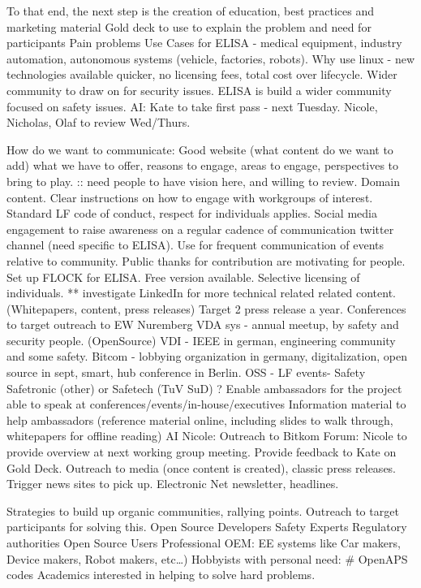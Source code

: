 \documentclass[12pt]{ElisaPaper}
\begin{document}
To that end, the next step is the creation of education, best practices and marketing material
Gold deck to use to explain the problem and need for participants
Pain problems
Use Cases for ELISA - medical equipment, industry automation,  autonomous systems (vehicle, factories, robots).   
Why use linux - new technologies available quicker,  no licensing fees, total cost over lifecycle.   Wider community to draw on for security issues.  ELISA is build a wider community focused on safety issues.
AI:  Kate to take first pass - next Tuesday.   Nicole, Nicholas, Olaf to review Wed/Thurs.  

How do we want to communicate:
Good website (what content do we want to add)
what we have to offer,  reasons to engage, areas to engage,  perspectives to bring to play. :: need people to have vision here, and willing to review.  Domain content.
Clear instructions on how to engage with workgroups of interest.
Standard LF code of conduct,  respect for individuals applies.
Social media engagement to raise awareness 
on a regular cadence of communication twitter channel (need specific to ELISA). Use for frequent communication of events relative to community.   Public thanks for contribution are motivating for people.   
Set up FLOCK for ELISA.   Free version available.  Selective licensing of individuals.   ** investigate
LinkedIn for more technical related related content.  (Whitepapers, content, press releases)
Target 2 press release a year.
Conferences to target outreach to 
EW Nuremberg
VDA sys - annual meetup, by safety and security people.  (OpenSource)
VDI - IEEE in german,  engineering community and some safety.
Bitcom - lobbying organization in germany,  digitalization,  open source in sept,  smart,  hub conference in Berlin. 
OSS - LF events- Safety
Safetronic (other) or Safetech (TuV SuD)
?
Enable ambassadors for the project able to speak at conferences/events/in-house/executives 
Information material to help ambassadors (reference material online, including slides to walk through, whitepapers for offline reading)
AI Nicole: Outreach to Bitkom Forum:  Nicole to provide overview at next working group meeting.  Provide feedback to Kate on Gold Deck.
Outreach to media (once content is created),  classic press releases.   Trigger news sites to pick up.    Electronic Net newsletter,  headlines.


Strategies to build up organic communities,  rallying points.
Outreach to target participants for solving this.
Open Source Developers 
Safety Experts
Regulatory authorities
Open Source Users 
Professional OEM:  EE systems like  Car makers, Device makers, Robot makers, etc…)
Hobbyists with personal need:  \# OpenAPS codes
Academics interested in helping to solve hard problems.
\end{document}
